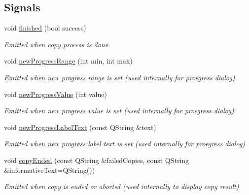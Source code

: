 \subsection*{Signals}
\begin{DoxyCompactItemize}
\item 
void \hyperlink{classmdt_file_copier_a808f01eb2a319e82a9fec5bb978ccb85}{finished} (bool success)
\begin{DoxyCompactList}\small\item\em Emitted when copy process is done. \end{DoxyCompactList}\item 
\hypertarget{classmdt_file_copier_a4c6c815614ab929ebe36f62f09296f25}{
void \hyperlink{classmdt_file_copier_a4c6c815614ab929ebe36f62f09296f25}{newProgressRange} (int min, int max)}
\label{classmdt_file_copier_a4c6c815614ab929ebe36f62f09296f25}

\begin{DoxyCompactList}\small\item\em Emitted when new progress range is set (used internally for proegress dialog) \end{DoxyCompactList}\item 
\hypertarget{classmdt_file_copier_a48c337249ec54bd9f672b079fca3116f}{
void \hyperlink{classmdt_file_copier_a48c337249ec54bd9f672b079fca3116f}{newProgressValue} (int value)}
\label{classmdt_file_copier_a48c337249ec54bd9f672b079fca3116f}

\begin{DoxyCompactList}\small\item\em Emitted when new progress value is set (used internally for proegress dialog) \end{DoxyCompactList}\item 
\hypertarget{classmdt_file_copier_a70626ba282633b15d2bdb398081c71be}{
void \hyperlink{classmdt_file_copier_a70626ba282633b15d2bdb398081c71be}{newProgressLabelText} (const QString \&text)}
\label{classmdt_file_copier_a70626ba282633b15d2bdb398081c71be}

\begin{DoxyCompactList}\small\item\em Emitted when new progress label text is set (used internally for proegress dialog) \end{DoxyCompactList}\item 
\hypertarget{classmdt_file_copier_aad51a259e0e55a67698d599e43dc1264}{
void \hyperlink{classmdt_file_copier_aad51a259e0e55a67698d599e43dc1264}{copyEnded} (const QString \&failedCopies, const QString \&informativeText=QString())}
\label{classmdt_file_copier_aad51a259e0e55a67698d599e43dc1264}

\begin{DoxyCompactList}\small\item\em Emitted when copy is ended or aborted (used internally to display copy result) \end{DoxyCompactList}\end{DoxyCompactItemize}
